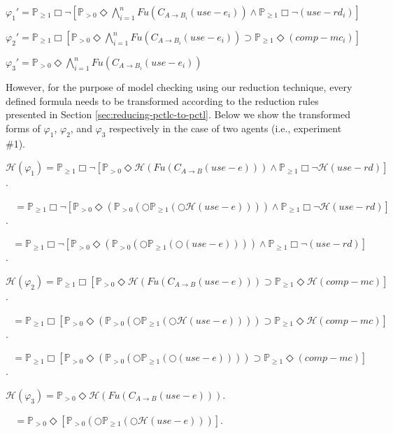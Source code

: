 $\varphi_1'= \mathbb{P}_{\geq1}\Box\neg[\mathbb{P}_{>0} \Diamond
\bigwedge\limits_{i=1}^n Fu(C_{A\rightarrow B_i} (use-e_i))\wedge \mathbb{P}_{\geq1}\Box\neg
(use-rd_i)]$

$\varphi_2'= \mathbb{P}_{\geq1}\Box[\mathbb{P}_{>0}\Diamond
\bigwedge\limits_{i=1}^n Fu(C_{A\rightarrow B_i} (use-e_i))\supset \mathbb{P}_{\geq1}\Diamond
(comp-mc_i)]$

$\varphi_3'= \mathbb{P}_{>0}\Diamond \bigwedge\limits_{i=1}^n Fu(C_{A\rightarrow B_i} (use-e_i))$


However, for the purpose of model checking using our reduction
technique, every defined formula needs to be transformed according
to the reduction rules presented in Section
\ref{sec:reducing-pctlc-to-pctl}. Below we show the transformed
forms of $\varphi_1$, $\varphi_2$, and $\varphi_3$ respectively in
the case of two agents (i.e., experiment \#1).

$\mathscr{H}(\varphi_1)= \mathbb{P}_{\geq1}\Box\neg[\mathbb{P}_{>0} \Diamond \mathscr{H}(Fu(C_{A\rightarrow B} (use-e)))\wedge \mathbb{P}_{\geq1}\Box\neg \mathscr{H}(use-rd)]$.

$~~~~= \mathbb{P}_{\geq1}\Box\neg[\mathbb{P}_{>0} \Diamond(\mathbb{P}_{>0}(\bigcirc\mathbb{P}_{\geq1}(\bigcirc\mathscr{H}(use-e))))
\wedge\mathbb{P}_{\geq1}\Box\neg \mathscr{H}(use-rd)]$.


$~~~= \mathbb{P}_{\geq1}\Box\neg[\mathbb{P}_{>0} \Diamond(\mathbb{P}_{>0}(\bigcirc\mathbb{P}_{\geq1}(\bigcirc(use-e))))
\wedge\mathbb{P}_{\geq1}\Box\neg (use-rd)]$.


$\mathscr{H}(\varphi_2)= \mathbb{P}_{\geq1}\Box[\mathbb{P}_{>0}\Diamond \mathscr{H}(Fu(C_{A\rightarrow B} (use-e)))\supset \mathbb{P}_{\geq1}\Diamond \mathscr{H}(comp-mc)]$.

$~~~= \mathbb{P}_{\geq1}\Box[\mathbb{P}_{>0}\Diamond(\mathbb{P}_{>0}
(\bigcirc\mathbb{P}_{\geq1}(\bigcirc\mathscr{H}(use-e))))\supset\mathbb{P}_{\geq1}\Diamond \mathscr{H}(comp-mc)]$.

$~~~= \mathbb{P}_{\geq1}\Box[\mathbb{P}_{>0}\Diamond(\mathbb{P}_{>0}
(\bigcirc\mathbb{P}_{\geq1}(\bigcirc(use-e))))\supset\mathbb{P}_{\geq1}\Diamond (comp-mc)]$.


$\mathscr{H}(\varphi_3)= \mathbb{P}_{>0}\Diamond \mathscr{H}(Fu(C_{A\rightarrow B} (use-e)))$.

$~~~~= \mathbb{P}_{>0}\Diamond [\mathbb{P}_{>0}(\bigcirc\mathbb{P}_{\geq1}(\bigcirc\mathscr{H}(use-e)))]$.


